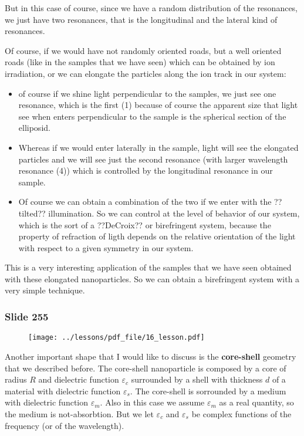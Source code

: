 \documentclass[../main/main.tex]{subfiles}
\begin{document}
But in this case of course, since we have a random distribution of the resonances, we just have two resonances, that is the longitudinal and the lateral kind of resonances.

Of course, if we would have not randomly oriented roads, but a well oriented roads (like in the samples that we have seen) which can be obtained by ion irradiation, or we can elongate the particles along the ion track in our system:
\begin{itemize}
\item of course if we shine light perpendicular to the samples, we just see one resonance, which is the first (1) because of course the apparent size that light see when enters perpendicular to the sample is the spherical section of the elliposid.
\item Whereas if we would enter laterally in the sample, light will see the elongated particles and we will see just the second resonance (with larger wavelength resonance (4)) which is controlled by the longitudinal resonance in our sample.
\item Of course we can obtain a combination of the two if we enter with the ??tilted?? illumination. So we can control at the level of behavior of our system, which is the sort of a ??DeCroix??  or birefringent system, because the property of refraction of ligth depends on the relative orientation of the light with respect to a given symmetry in our system.
\end{itemize}
 This is a very interesting application of the samples that we have seen obtained with these elongated nanoparticles. So we can obtain a birefringent system with a very simple technique.

\newpage

\subsubsection{Slide 255}

\begin{figure}[h!]
\centering
\texttt{[image: ../lessons/pdf\_file/16\_lesson.pdf]}
\end{figure}

Another important shape that I would like to discuss is the \textbf{core-shell} geometry that we described before. The core-shell nanoparticle is composed by a core of radius \( R \) and dielectric function \( \varepsilon _c \) surrounded by a shell with thickness \( d \) of a material with dielectric function \( \varepsilon _s \). The core-shell is sorrounded by a medium with dielectric function \( \varepsilon _m \). Also in this case we assume \( \varepsilon _m \) as a real quantity, so the medium is not-absorbtion. But we let \( \varepsilon _c \) and \( \varepsilon _s \) be complex functions of the frequency (or of the wavelength).
\end{document}
